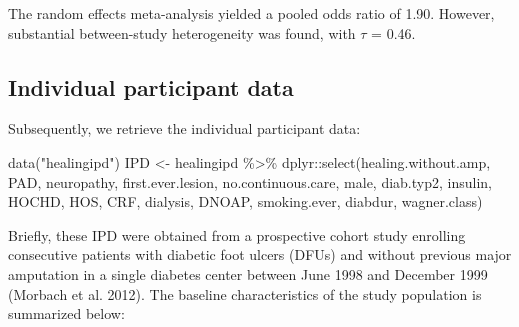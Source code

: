 \documentclass[
  letterpaper,
  DIV=11,
  numbers=noendperiod]{scrreprt}
\newenvironment{Shaded}{\begin{snugshade}}{\end{snugshade}}
\newcommand{\FunctionTok}[1]{\textcolor[rgb]{0.28,0.35,0.67}{#1}}
\newcommand{\NormalTok}[1]{\textcolor[rgb]{0.00,0.23,0.31}{#1}}
\newcommand{\OtherTok}[1]{\textcolor[rgb]{0.00,0.23,0.31}{#1}}
\newcommand{\SpecialCharTok}[1]{\textcolor[rgb]{0.37,0.37,0.37}{#1}}
\newcommand{\StringTok}[1]{\textcolor[rgb]{0.13,0.47,0.30}{#1}}
\begin{document}
The random effects meta-analysis yielded a pooled odds ratio of 1.90.
However, substantial between-study heterogeneity was found, with
\(\tau\) = 0.46.

\hypertarget{individual-participant-data}{%
\subsection{Individual participant
data}\label{individual-participant-data}}

Subsequently, we retrieve the individual participant data:

\begin{Shaded}
\begin{Highlighting}[]
\FunctionTok{data}\NormalTok{(}\StringTok{"healingipd"}\NormalTok{)}
\NormalTok{IPD }\OtherTok{\textless{}{-}}\NormalTok{ healingipd }\SpecialCharTok{\%\textgreater{}\%}\NormalTok{ dplyr}\SpecialCharTok{::}\FunctionTok{select}\NormalTok{(healing.without.amp, PAD, neuropathy,}
\NormalTok{                                    first.ever.lesion, no.continuous.care, }
\NormalTok{                                    male, diab.typ2, insulin, HOCHD, }
\NormalTok{                                    HOS, CRF, dialysis, DNOAP, smoking.ever, }
\NormalTok{                                    diabdur, wagner.class)}
\end{Highlighting}
\end{Shaded}

Briefly, these IPD were obtained from a prospective cohort study
enrolling consecutive patients with diabetic foot ulcers (DFUs) and
without previous major amputation in a single diabetes center between
June 1998 and December 1999 (Morbach et al. 2012). The baseline
characteristics of the study population is summarized below:
\end{document}
